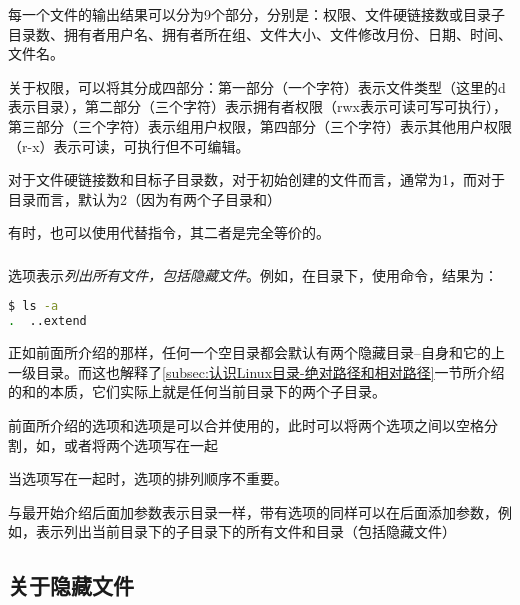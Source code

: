 \begin{extend}
每一个文件的输出结果可以分为9个部分，分别是：权限、文件硬链接数或目录子目录数、拥有者用户名、拥有者所在组、文件大小、文件修改月份、日期、时间、文件名。

关于权限，可以将其分成四部分：第一部分（一个字符）表示文件类型（这里的d表示目录），第二部分（三个字符）表示拥有者权限（rwx表示可读可写可执行），第三部分（三个字符）表示组用户权限，第四部分（三个字符）表示其他用户权限（r-x）表示可读，可执行但不可编辑。

对于文件硬链接数和目标子目录数，对于初始创建的文件而言，通常为1，而对于目录而言，默认为2（因为有两个子目录和）
\end{extend}

有时，也可以使用代替指令，其二者是完全等价的。

\subsubsection{}

选项表示\emph{列出所有文件，包括隐藏文件}。例如，在目录下，使用命令，结果为：

\begin{lstlisting}[language=bash]
$ ls -a
.  ..extend
\end{lstlisting}

\begin{extend}
    正如前面所介绍的那样，任何一个空目录都会默认有两个隐藏目录--自身和它的上一级目录。而这也解释了\ref{subsec:认识Linux目录-绝对路径和相对路径}一节所介绍的和的本质，它们实际上就是任何当前目录下的两个子目录。
\end{extend}

\begin{attention}
    前面所介绍的选项和选项是可以合并使用的，此时可以将两个选项之间以空格分割，如，或者将两个选项写在一起

    当选项写在一起时，选项的排列顺序不重要。

    与最开始介绍后面加参数表示目录一样，带有选项的同样可以在后面添加参数，例如，表示列出当前目录下的子目录下的所有文件和目录（包括隐藏文件）
\end{attention}

\subsection{关于隐藏文件}\label{subsec:目录操作-关于隐藏文件}

